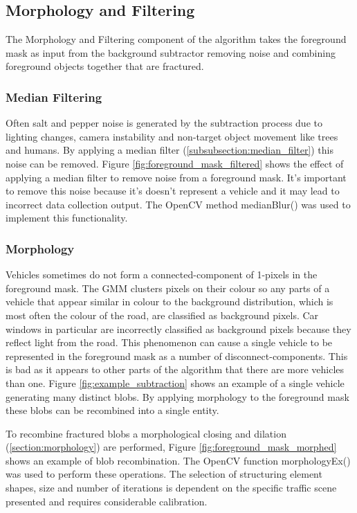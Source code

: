 \subsection{Morphology and Filtering}

The Morphology and Filtering component of the algorithm takes the foreground mask as input from the background subtractor removing noise and combining foreground objects together that are fractured. 

\subsubsection{Median Filtering}

Often salt and pepper noise is generated by the subtraction process due to lighting changes, camera instability and non-target object movement like trees and humans. By applying a median filter (\ref{subsubsection:median_filter}) this noise can be removed. Figure \ref{fig:foreground_mask_filtered} shows the effect of applying a median filter to remove noise from a foreground mask. It's important to remove this noise because it's doesn't represent a vehicle and it may lead to incorrect data collection output. The OpenCV method medianBlur() was used to implement this functionality.

\subsubsection{Morphology}

Vehicles sometimes do not form a connected-component of 1-pixels in the foreground mask. The GMM clusters pixels on their colour so any parts of a vehicle that appear similar in colour to the background distribution, which is most often the colour of the road, are classified as background pixels. Car windows in particular are incorrectly classified as background pixels because they reflect light from the road. This phenomenon can cause a single vehicle to be represented in the foreground mask as a number of disconnect-components. This is bad as it appears to other parts of the algorithm that there are more vehicles than one. Figure \ref{fig:example_subtraction} shows an example of a single vehicle generating many distinct blobs. By applying morphology to the foreground mask these blobs can be recombined into a single entity.

To recombine fractured blobs a morphological closing and dilation (\ref{section:morphology}) are performed, Figure \ref{fig:foreground_mask_morphed} shows an example of blob recombination. The OpenCV function morphologyEx() was used to perform these operations. The selection of structuring element shapes, size and number of iterations is dependent on the specific traffic scene presented and requires considerable calibration. 

